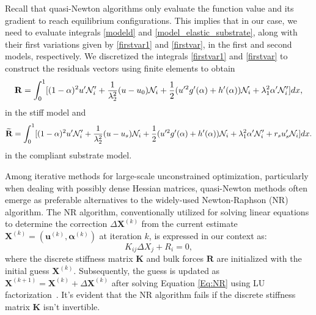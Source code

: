 Recall that quasi-Newton algorithms only evaluate the function value and its gradient to reach equilibrium configurations. This implies that in our case, we need to evaluate integrals \eqref{modeld} and \eqref{model_elastic_substrate}, along with their first variations given by \eqref{firstvar1} and \eqref{firstvar}, in the first and second models, respectively. We   discretized the integrals \eqref{firstvar1} and \eqref{firstvar} to construct the residuals vectors using finite elements to obtain 
\begin{equation}
    {\bf R} =
     \int_0^1 [(1-\alpha)^2u'\mathcal{N}'_i+\frac{1}{\lambda_2^2} (u-u_0) \mathcal{N}_i+\frac{1}{2}(u'^2 g'(\alpha)+h'(\alpha))\mathcal{N}_i+\lambda_1^2\alpha'\mathcal{N}'_i ]dx,\label{residual1}
\end{equation}
in the stiff model and 
\begin{equation}
    \widetilde{{\bf R}}= 
    \int_0^1 [(1-\alpha)^2u'\mathcal{N}'_i+\frac{1}{\lambda_2^2} (u-u_s) \mathcal{N}_i+\frac{1}{2}(u'^2 g'(\alpha)+h'(\alpha))\mathcal{N}_i+\lambda_1^2\alpha'\mathcal{N}'_i +r_su_s'\mathcal{N}_i]dx\label{residual2}.
\end{equation}
in the compliant substrate model. 

Among iterative methods for large-scale unconstrained optimization, particularly when dealing with possibly dense Hessian matrices,  quasi-Newton methods often emerge as preferable alternatives to the widely-used Newton-Raphson (NR) algorithm. The NR algorithm, conventionally utilized for solving linear equations to determine the correction $\Delta \mathbf{X}^{(k)}$ from the current estimate $\mathbf{X}^{(k)} = (\mathbf{u}^{(k)}, \boldsymbol{\alpha}^{(k)})$ at iteration $k$, is expressed in our context as:
\begin{equation}
K_{ij} \Delta X_j + R_i = 0,
\label{Eq:NR}
\end{equation}
where the discrete stiffness matrix $\mathbf{K}$ and bulk forces $\mathbf{R}$ are initialized with the initial guess $\mathbf{X}^{(k)}$. Subsequently, the guess is updated as $\mathbf{X}^{(k+1)} = \mathbf{X}^{(k)} + \Delta \mathbf{X}^{(k)}$ after solving Equation \eqref{Eq:NR} using LU factorization~\cite{Sanderson2016-ht}. It's evident that the NR algorithm fails if the discrete stiffness matrix $\mathbf{K}$ isn't invertible.

